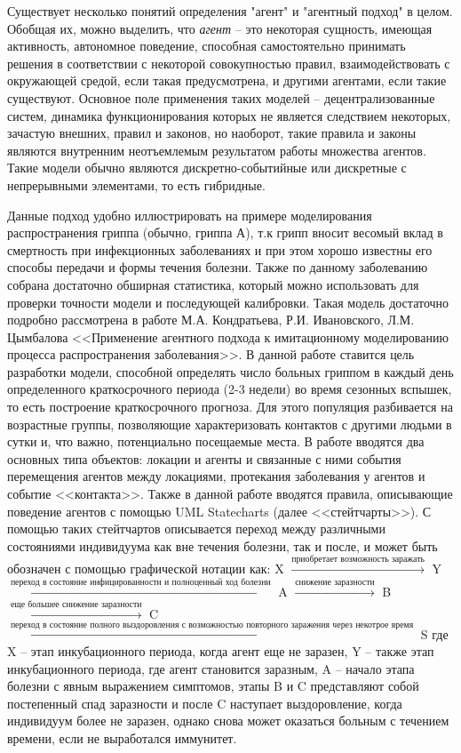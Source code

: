 Существует несколько понятий определения "агент" и "агентный подход" в целом. Обобщая их, можно выделить, что  \textit{агент}  -- это некоторая сущность, имеющая активность, автономное поведение, способная самостоятельно принимать решения в соответствии с некоторой совокупностью правил, взаимодействовать с окружающей средой, если такая предусмотрена, и другими агентами, если такие существуют. Основное поле применения таких моделей -- децентрализованные систем, динамика функционирования которых не является следствием некоторых, зачастую внешних, правил и законов, но наоборот, такие правила и законы являются внутренним неотъемлемым результатом работы множества агентов. Такие модели обычно являются  дискретно-событийные или дискретные с непрерывными элементами, то есть гибридные. 

Данные подход удобно иллюстрировать на примере моделирования распространения гриппа (обычно, гриппа А), т.к грипп вносит весомый вклад в смертность при инфекционных заболеваниях и при этом хорошо известны его способы передачи и формы течения болезни. Также по данному заболеванию собрана достаточно обширная статистика, который можно использовать для проверки точности модели и последующей калибровки.  Такая модель достаточно подробно рассмотрена в работе М.А. Кондратьева, Р.И. Ивановского, Л.М. Цымбалова <<Применение агентного подхода к имитационному моделированию процесса распространения заболевания>>. В данной работе ставится цель  разработки модели, способной определять число больных гриппом в каждый день определенного краткосрочного периода (2-3 недели) во время сезонных вспышек, то есть построение краткосрочного прогноза. Для этого популяция  разбивается на возрастные группы, позволяющие характеризовать контактов с другими людьми в сутки и, что важно, потенциально посещаемые места. В работе вводятся два основных типа объектов: локации и агенты и связанные с ними события перемещения агентов между локациями, протекания заболевания у агентов и событие <<контакта>>. Также в данной работе вводятся правила, описывающие поведение агентов с помощью UML Statecharts (далее <<стейтчарты>>). С помощью таких стейтчартов описывается переход между различными состояниями индивидуума как вне течения болезни, так и после, и может быть обозначен с помощью графической нотации как: 
\newline  
X  $  \xrightarrow{\text{приобретает возможность заражать}} $ \newline Y    $ \xrightarrow{\text{переход в состояние инфицированности и полноценный ход болезни}} $   A   $ \xrightarrow{\text{снижение заразности}} $   B   $ \xrightarrow{\text{еще большее снижение заразности}} $  \newline C   $ \xrightarrow{\text{переход в состояние полного выздоровления с возможностью повторного заражения через некотрое время}} $   S 
\newline
где X -- этап инкубационного периода, когда агент еще не заразен, Y -- также этап инкубационного периода, где агент становится заразным, A -- начало этапа болезни с явным выражением симптомов, этапы B и C представляют собой постепенный спад заразности и после C наступает выздоровление, когда индивидуум более не заразен, однако снова может оказаться больным с течением времени, если не выработался иммунитет. 


